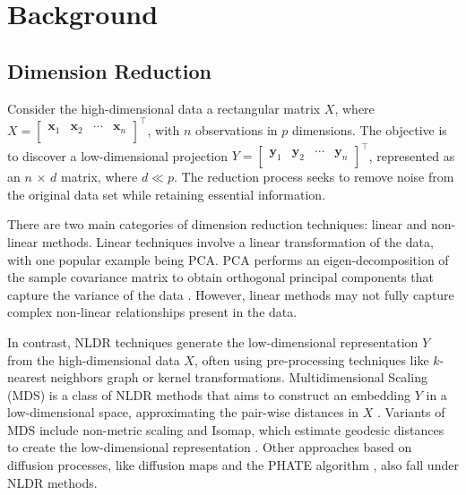 \documentclass[
  12pt]{article}
\begin{document}
\hypertarget{sec-background}{%
\section{Background}\label{sec-background}}

\hypertarget{dimension-reduction}{%
\subsection{Dimension Reduction}\label{dimension-reduction}}

Consider the high-dimensional data a rectangular matrix \(X\), where
\(X = \begin{bmatrix} \textbf{x}_{1} & \textbf{x}_{2} & \cdots & \textbf{x}_{n}\\ \end{bmatrix}^\top\),
with \(n\) observations in \(p\) dimensions. The objective is to
discover a low-dimensional projection
\(Y = \begin{bmatrix} \textbf{y}_{1} & \textbf{y}_{2} & \cdots & \textbf{y}_{n}\\ \end{bmatrix}^\top\),
represented as an \(n\) × \(d\) matrix, where \(d \ll p\). The reduction
process seeks to remove noise from the original data set while retaining
essential information.

There are two main categories of dimension reduction techniques: linear
and non-linear methods. Linear techniques involve a linear
transformation of the data, with one popular example being PCA. PCA
performs an eigen-decomposition of the sample covariance matrix to
obtain orthogonal principal components that capture the variance of the
data \citep{Karl1901}. However, linear methods may not fully capture
complex non-linear relationships present in the data.

In contrast, NLDR techniques generate the low-dimensional representation
\(Y\) from the high-dimensional data \(X\), often using pre-processing
techniques like \(k\)-nearest neighbors graph or kernel transformations.
Multidimensional Scaling (MDS) is a class of NLDR methods that aims to
construct an embedding \(Y\) in a low-dimensional space, approximating
the pair-wise distances in \(X\) \citep{Torgerson1967}. Variants of MDS
include non-metric scaling \citep{article62} and Isomap, which estimate
geodesic distances to create the low-dimensional representation
\citep{article63}. Other approaches based on diffusion processes, like
diffusion maps \citep{article64} and the PHATE algorithm
\citep{article03}, also fall under NLDR methods.
\end{document}
